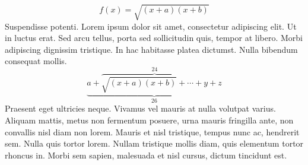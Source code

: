 \begin{equation} f(x)=\sqrt{(x+a)(x+b)} \end{equation}
Suspendisse potenti. Lorem ipsum dolor sit amet, consectetur adipiscing elit. Ut in luctus erat. Sed arcu tellus, porta sed sollicitudin quis, tempor at libero. Morbi adipiscing dignissim tristique. In hac habitasse platea dictumst. Nulla bibendum consequat mollis.
$$ \underbrace{a+\overbrace{\sqrt{(x+a)(x+b)}+\cdots+y}^{24}+z}_{26} $$
Praesent eget ultricies neque. Vivamus vel mauris at nulla volutpat varius. Aliquam mattis, metus non fermentum posuere, urna mauris fringilla ante, non convallis nisl diam non lorem. Mauris et nisl tristique, tempus nunc ac, hendrerit sem. Nulla quis tortor lorem. Nullam tristique mollis diam, quis elementum tortor rhoncus in. Morbi sem sapien, malesuada et nisl cursus, dictum tincidunt est.

